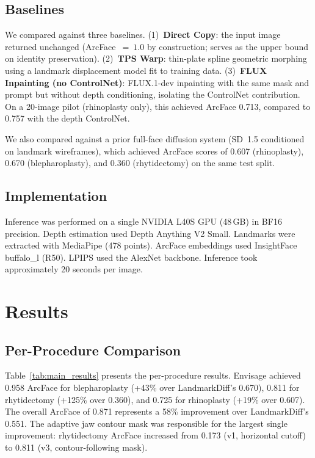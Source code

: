 \documentclass[runningheads]{llncs}
\newcommand{\method}{Envisage}
\begin{document}
\subsection{Baselines}

We compared against three baselines.
(1)~\textbf{Direct Copy}: the input image returned unchanged (ArcFace~$=~1.0$
by construction; serves as the upper bound on identity preservation).
(2)~\textbf{TPS Warp}: thin-plate spline geometric morphing using a
landmark displacement model fit to training data.
(3)~\textbf{FLUX Inpainting (no ControlNet)}: FLUX.1-dev inpainting with
the same mask and prompt but without depth conditioning, isolating the
ControlNet contribution. On a 20-image pilot (rhinoplasty only), this achieved ArcFace 0.713,
compared to 0.757 with the depth ControlNet.

We also compared against a prior full-face diffusion system (SD~1.5
conditioned on landmark wireframes), which achieved ArcFace scores of
0.607 (rhinoplasty), 0.670 (blepharoplasty), and 0.360 (rhytidectomy)
on the same test split.

\subsection{Implementation}

Inference was performed on a single NVIDIA L40S GPU (48\,GB) in BF16
precision. Depth estimation used Depth Anything V2 Small. Landmarks were
extracted with MediaPipe (478 points). ArcFace embeddings used InsightFace
buffalo\_l (R50). LPIPS used the AlexNet backbone. Inference took
approximately 20 seconds per image.

\section{Results}
\label{sec:results}

\subsection{Per-Procedure Comparison}

Table~\ref{tab:main_results} presents the per-procedure results.
\method{} achieved 0.958 ArcFace for blepharoplasty (+43\% over
LandmarkDiff's 0.670), 0.811 for rhytidectomy (+125\% over 0.360), and
0.725 for rhinoplasty (+19\% over 0.607). The overall ArcFace of 0.871
represents a 58\% improvement over LandmarkDiff's 0.551. The adaptive
jaw contour mask was responsible for the largest single improvement:
rhytidectomy ArcFace increased from 0.173 (v1, horizontal cutoff) to
0.811 (v3, contour-following mask).
\end{document}
